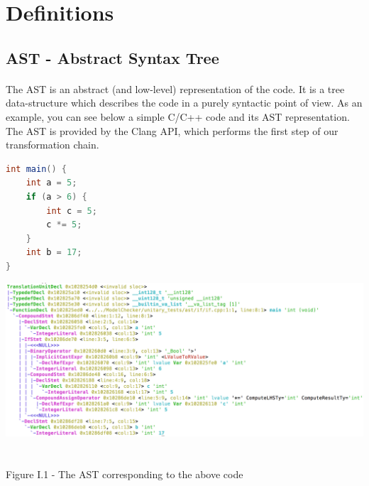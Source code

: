 \documentclass{report}
\begin{document}
\section{Definitions}

\subsection{AST - Abstract Syntax Tree}

\paragraph{}
\hspace{4mm}The AST is an abstract (and low-level) representation of the code. It is a tree data-structure which describes the code in a purely syntactic point of view. As an example,
you can see below a simple C/C++ code and its AST representation. The AST is provided by the Clang API, which performs the first step of our
transformation chain.

\begin{lstlisting}[language=java
]
int main() {
    int a = 5;
    if (a > 6) {
        int c = 5;
        c *= 5;
    }
    int b = 17;
}
\end{lstlisting}
\begin{center}
\includegraphics[scale=0.6]{data/ifClang.png}
~\\~\\Figure I.1 - The AST corresponding to the above code
\end{center}
\end{document}
